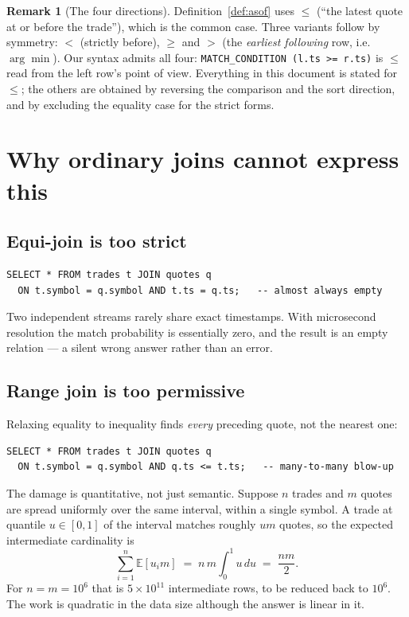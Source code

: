 \documentclass[11pt,a4paper]{report}
\theoremstyle{definition}
\newtheorem{remark}[definition]{Remark}
\theoremstyle{plain}
\newcommand{\code}[1]{\texttt{\small #1}}
\begin{document}
\begin{remark}[The four directions]
Definition~\ref{def:asof} uses $\le$ (``the latest quote at or before the trade''), which
is the common case. Three variants follow by symmetry: $<$ (strictly before), $\ge$ and $>$
(the \emph{earliest following} row, i.e.\ $\arg\min$). Our syntax admits all four:
\code{MATCH\_CONDITION (l.ts >= r.ts)} is $\le$ read from the left row's point of view.
Everything in this document is stated for $\le$; the others are obtained by reversing the
comparison and the sort direction, and by excluding the equality case for the strict forms.
\end{remark}

\section{Why ordinary joins cannot express this}

\subsection*{Equi-join is too strict}

\begin{lstlisting}
SELECT * FROM trades t JOIN quotes q
  ON t.symbol = q.symbol AND t.ts = q.ts;   -- almost always empty
\end{lstlisting}
Two independent streams rarely share exact timestamps. With microsecond resolution the
match probability is essentially zero, and the result is an empty relation --- a silent
wrong answer rather than an error.

\subsection*{Range join is too permissive}

Relaxing equality to inequality finds \emph{every} preceding quote, not the nearest one:

\begin{lstlisting}
SELECT * FROM trades t JOIN quotes q
  ON t.symbol = q.symbol AND q.ts <= t.ts;   -- many-to-many blow-up
\end{lstlisting}

The damage is quantitative, not just semantic. Suppose $n$ trades and $m$ quotes are spread
uniformly over the same interval, within a single symbol. A trade at quantile $u \in [0,1]$
of the interval matches roughly $um$ quotes, so the expected intermediate cardinality is
\[
  \sum_{i=1}^{n} \mathbb{E}[u_i m] \;=\; n\,m \int_0^1 u \,du \;=\; \frac{nm}{2}.
\]
For $n = m = 10^6$ that is $5\times 10^{11}$ intermediate rows, to be reduced back to
$10^6$. The work is quadratic in the data size although the answer is linear in it.
\end{document}
